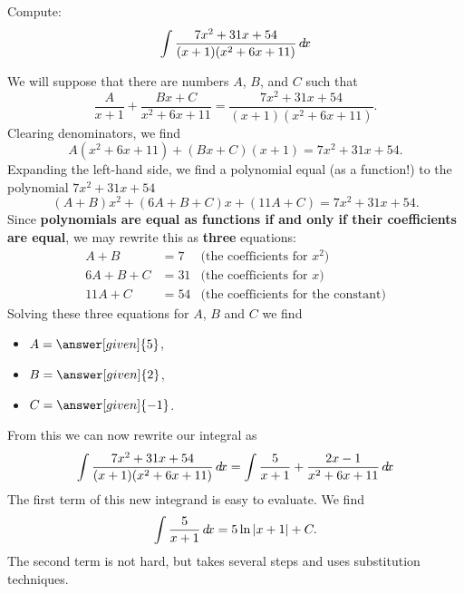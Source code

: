 \documentclass{ximera}
\begin{document}
\begin{example}
  Compute:
  \[
  \int\frac{7x^2+31x+54}{(x+1)(x^2+6x+11)}\mathop{}\!d\! x
  \]
  \begin{explanation}
    We will suppose that there are numbers $A$, $B$, and $C$ such that
    \[
    \frac{A}{x+1} + \frac{Bx+C}{x^2+6x+11} = \frac{7x^2+31x+54}{(x+1)(x^2+6x+11)}.
    \]
    Clearing denominators, we find
    \[
    A(x^2+6x+11) + (Bx+C)(x+1) = 7x^2+31x+54.
    \]
    Expanding the left-hand side, we find a polynomial equal (as a
    function!) to the polynomial $7x^2+31x+54$
    \[
    (A+B)x^2 + (6A+B+C)x + (11A+C) = 7x^2+31x+54.
    \]
    Since \textbf{polynomials are equal as functions if and only if
      their coefficients are equal}, we may rewrite this as
    \textbf{three} equations:
    \begin{align*}
      A+B &= 7 &\text{(the coefficients for $x^2$)}\\
      6A+B+C &= 31 &\text{(the coefficients for $x$)}\\
      11A+C &= 54 &\text{(the coefficients for the constant)}
    \end{align*}
    Solving these three equations for $A$, $B$ and $C$ we find
    \begin{itemize}
    \item $A = \answer[given]{5}$,
    \item $B = \answer[given]{2}$,
    \item $C = \answer[given]{-1}$.
    \end{itemize}
    From this we can now rewrite our integral as
    \[
    \int\frac{7x^2+31x+54}{(x+1)(x^2+6x+11)}\mathop{}\!d\! x = \int\frac{5}{x+1} + \frac{2x-1}{x^2+6x+11} \mathop{}\!d\! x\\
    \]
    The first term of this new integrand is easy to evaluate. We find
    \[
    \int \frac{5}{x+1} \mathop{}\!d\! x = 5\ln|x+1|+C.
    \]
    The second term is not hard, but takes several steps and uses
    substitution techniques.


\end{explanation}
\end{example}
\end{document}

